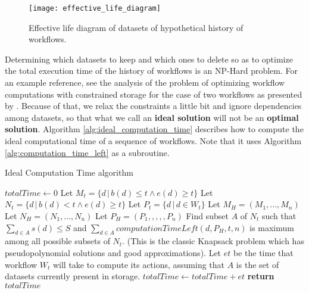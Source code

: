 \begin{figure}
\centering
\texttt{[image: effective\_life\_diagram]}
\caption{Effective life diagram of datasets of hypothetical history of workflows.}
\label{fig:effective_life}
\end{figure}

Determining which datasets to keep and which ones to delete so as to optimize the total execution time of the history of workflows is an NP-Hard problem.  For an example reference, see the analysis of the problem of optimizing workflow computations with constrained storage for the case of two workflows as presented by \cite{zohrevandi2013bounded}.  Because of that, we relax the constraints a little bit and ignore dependencies among datasets, so that what we call an \textbf{ideal solution} will not be an \textbf{optimal solution}.  Algorithm \ref{alg:ideal_computation_time} describes how to compute the ideal computational time of a sequence of workflows.  Note that it uses Algorithm \ref{alg:computation_time_left} as a subroutine.

\begin{algorithm}
\begin{singlespace}
\caption{Ideal Computation Time algorithm}
\label{alg:ideal_computation_time}
\begin{algorithmic}[1]
	\State $totalTime \gets 0$
		\State Let $M_t = \{ d\, |\, b(d) \leq t \wedge e(d) \geq t \}$
		\State Let $N_t = \{ d\, |\, b(d) < t \wedge e(d) \geq t \}$ 
		\State Let $P_t = \{ d\, |\, d \in W_t \}$ 
	\EndFor
	\State Let $M_H = (M_1, ..., M_n)$
	\State Let $N_H = (N_1, ..., N_n)$
	\State Let $P_H = (P_1, ,,,, P_n)$
		\State Find subset $A$ of $N_t$ such that $\sum_{d \in A}{s(d)} \leq S$ and $\sum_{d \in A}{computationTimeLeft(d, P_H, t, n)}$ is maximum among all possible subsets of $N_t$.  (This is the classic Knapsack problem which has pseudopolynomial solutions and good approximations).
		\State Let $et$ be the time that workflow $W_t$ will take to compute its actions, assuming that $A$ is the set of datasets currently present in storage.
		\State $totalTime \gets totalTime + et$
	\EndFor
	\State \textbf{return} $totalTime$
\EndProcedure
\end{algorithmic}
\end{singlespace}
\end{algorithm}

